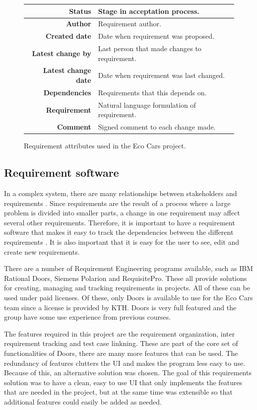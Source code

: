 \begin{figure}[H]
    \centering
    \label{tab:req_attr}
    \caption{Requirement attributes used in the Eco Cars project.}
    \begin{tabular}{r | l }
        \bf{Status} & Stage in acceptation process. \\
        \hline
        \bf{Author} & Requirement author. \\
        \hline
        \bf{Created date} & Date when requirement was proposed. \\
        \hline
        \bf{Latest change by} & Last person that made changes to requirement. \\
        \hline
        \bf{Latest change date} & Date when requirement was last changed. \\
        \hline
        \bf{Dependencies} & Requirements that this depends on. \\
        \hline
        \bf{Requirement} & Natural language formulation of requirement. \\
        \hline
        \bf{Comment} & Signed comment to each change made.
    \end{tabular}
\end{figure}

\subsection{Requirement software}
In a complex system, there are many relationships between stakeholders and
requirements \cite{ibm_req}. Since requirements are the result of a process
where a large problem is divided into smaller parts, a change in one requirement
may affect several other requirements. Therefore, it is important to have a
requirement software that makes it easy to track the dependencies between the
different requirements \cite{ibm_req}. It is also important that it is easy for
the user to see, edit and create new requirements.

There are a number of Requirement Engineering programs available, such as IBM
Rational Doors, Siemens Polarion and RequisitePro. These all provide solutions
for creating, managing and tracking requirements in projects. All of these can
be used under paid licenses. Of these, only Doors is available to use for the
Eco Cars team since a license is provided by KTH. Doors is very full featured
and the group have some use experience from previous courses. 

The features required in this project are the requirement organization, inter
requirement tracking and test case linkning. These are part of the core set of
functionalities of Doors, there are many more features that can be used. The
redundancy of features clutters the UI and makes the program less easy to use.
Because of this, an alternative solution was chosen. The goal of this
requirements solution was to have a clean, easy to use UI that only implements
the features that are needed in the project, but at the same time was
extensible so that additional features could easily be added as needed.

